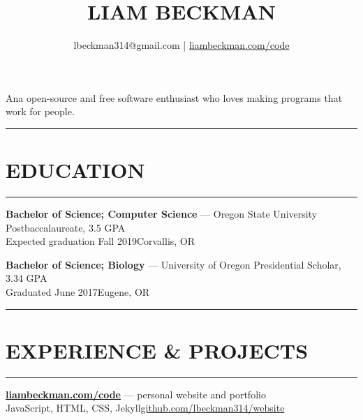 


\title{\textcolor{my-red}{LIAM BECKMAN}}
\author{lbeckman314@gmail.com | \href{https://liambeckman.com/code}{liambeckman.com/code}}

\date{\vspace{-5ex}}



\maketitle

\begin{center}
Ana open-source and free software enthusiast who loves making programs that work for people.
\end{center}

\newcommand{\myTitle}[1] {
    \textcolor{my-grey}{\rule{\textwidth}{1pt}\vspace{-1.5em}}
    \section*{\large{#1}}\vspace{-1.5em}
    \textcolor{my-grey}{\rule{\linewidth}{1pt}}
}

\newcommand{\showoff}[4] {
    \textcolor{my-blue}{\textbf{#1}} --- #2\\
    \textcolor{my-grey}{#3\hfill#4}
    \medbreak
}

\newcommand{\myBreak} {
    \textcolor{my-grey}{\dotfill}
    \medbreak
}

\myTitle{EDUCATION}

\showoff{Bachelor of Science; Computer Science}{Oregon State University Postbaccalaureate, 3.5 GPA}{Expected graduation Fall 2019}{Corvallis, OR}

\myBreak

\showoff{Bachelor of Science; Biology}{University of Oregon Presidential Scholar, 3.34 GPA}{Graduated June 2017}{Eugene, OR}

\medbreak

\myTitle{EXPERIENCE \& PROJECTS}

\showoff{\href{https://liambeckman.com}{liambeckman.com/code}}{personal website and portfolio}{JavaScript, HTML, CSS, Jekyll}{\href{https://github.com/lbeckman314/website}{github.com/lbeckman314/website}}

